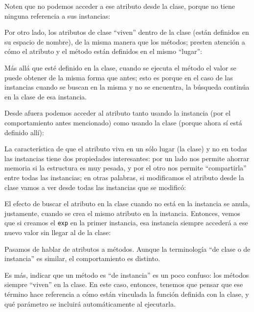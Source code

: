 Noten que no podemos acceder a ese atributo desde la clase, porque no tiene ninguna referencia a sus instancias:


Por otro lado, los atributos de clase ``viven'' dentro de la clase (están definidos en su espacio de nombre), de la misma manera que los métodos; presten atención a cómo el atributo y el método están definidos en el mismo ``lugar'':


Más allá que esté definido en la clase, cuando se ejecuta el método el valor se puede obtener de la misma forma que antes; esto es porque en el caso de las instancias cuando se buscan en la misma y no se encuentra, la búsqueda continúa en la clase de esa instancia.

Desde afuera podemos acceder al atributo tanto usando la instancia (por el comportamiento antes mencionado) como usando la clase (porque ahora sí está definido allí):


La característica de que el atributo viva en un sólo lugar (la clase) y no en todas las instancias tiene dos propiedades interesantes: por un lado nos permite ahorrar memoria si la estructura es muy pesada, y por el otro nos permite ``compartirla'' entre todas las instancias; en otras palabras, si modificamos el atributo desde la clase vamos a ver desde todas las instancias que se modificó:


El efecto de buscar el atributo en la clase cuando no está en la instancia se anula, justamente, cuando se crea el mismo atributo en la instancia. Entonces, vemos que si creamos el \texttt{exp} en la primer instancia, esa instancia siempre accederá a ese nuevo valor sin llegar al de la clase:


Pasamos de hablar de atributos a métodos. Aunque la terminología ``de clase o de instancia'' es similar, el comportamiento es distinto.

Es más, indicar que un método es ``de instancia'' es un poco confuso: los métodos siempre ``viven'' en la clase. En este caso, entonces, tenemos que pensar que ese término hace referencia a cómo están vinculada la función definida con la clase, y qué parámetro se incluirá automáticamente al ejecutarla.

